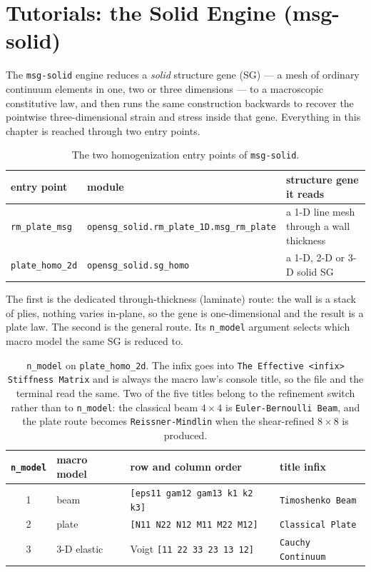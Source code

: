 \chapter{Tutorials: the Solid Engine (msg-solid)}
\label{ch:solid}

The \texttt{msg-solid} engine reduces a \emph{solid} structure gene (SG) --- a
mesh of ordinary continuum elements in one, two or three dimensions --- to a
macroscopic constitutive law, and then runs the same construction backwards to
recover the pointwise three-dimensional strain and stress inside that gene.
Everything in this chapter is reached through two entry points.

\begin{table}[htbp]
\centering
\footnotesize
\begin{tabular}{llp{4.8cm}}
\toprule
entry point & module & structure gene it reads \\
\midrule
\texttt{rm\_plate\_msg} & \texttt{opensg\_solid.rm\_plate\_1D.msg\_rm\_plate}
  & a 1-D line mesh through a wall thickness \\
\texttt{plate\_homo\_2d} & \texttt{opensg\_solid.sg\_homo}
  & a 1-D, 2-D or 3-D solid SG \\
\bottomrule
\end{tabular}
\caption{The two homogenization entry points of \texttt{msg-solid}.}
\label{tab:solid-entry}
\end{table}

The first is the dedicated through-thickness (laminate) route: the wall is a
stack of plies, nothing varies in-plane, so the gene is one-dimensional and the
result is a plate law. The second is the general route. Its \texttt{n\_model}
argument selects which macro model the same SG is reduced to.

\begin{table}[htbp]
\centering
\footnotesize
\begin{tabular}{clll}
\toprule
\texttt{n\_model} & macro model & row and column order & title infix \\
\midrule
1 & beam & \texttt{[eps11 gam12 gam13 k1 k2 k3]} & \texttt{Timoshenko Beam} \\
2 & plate & \texttt{[N11 N22 N12 M11 M22 M12]} & \texttt{Classical Plate} \\
3 & 3-D elastic & Voigt \texttt{[11 22 33 23 13 12]} & \texttt{Cauchy Continuum} \\
\bottomrule
\end{tabular}
\caption{\texttt{n\_model} on \texttt{plate\_homo\_2d}. The infix goes into
\texttt{The Effective <infix> Stiffness Matrix} and is always the macro law's
console title, so the file and the terminal read the same. Two of the five
titles belong to the refinement switch rather than to \texttt{n\_model}: the
classical beam $4\times4$ is \texttt{Euler-Bernoulli Beam}, and the plate route
becomes \texttt{Reissner-Mindlin} when the shear-refined $8\times8$ is
produced.}
\label{tab:solid-nmodel}
\end{table}

